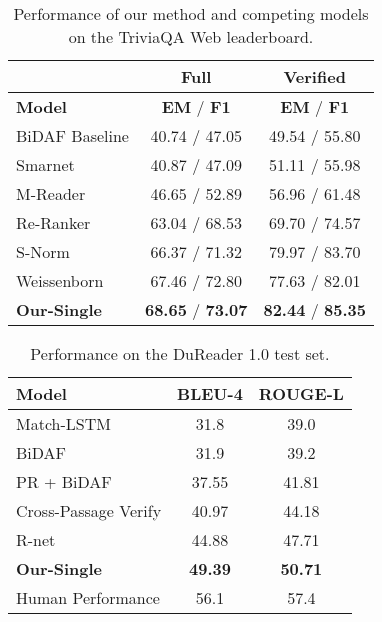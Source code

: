 \documentclass[letterpaper]{article} \usepackage{aaai19}  \usepackage{graphicx}
\begin{document}
\begin{table}[t]
\scriptsize
\centering
\caption{\label{tab:1} Performance of our method and competing models on the TriviaQA Web leaderboard.}
\begin{tabular}{lcc}
\hline
     & \textbf{Full} & \textbf{Verified} \\
\hline
   \textbf{Model} & \textbf{EM} / \textbf{F1} & \textbf{EM} / \textbf{F1} \\
\hline
    BiDAF Baseline \cite{joshi2017triviaqa} & 40.74 / 47.05 &  49.54 / 55.80 \\
    Smarnet \cite{chen2017smarnet} & 40.87 / 47.09 & 51.11 / 55.98 \\
    M-Reader \cite{hu2017reinforced} & 46.65 / 52.89 & 56.96 / 61.48 \\
    Re-Ranker \cite{wang2017evidence} &  63.04 / 68.53 &  69.70 / 74.57 \\
    S-Norm \cite{clark2017simple} &  66.37 / 71.32 &  79.97 / 83.70 \\
Weissenborn \cite{weissenborn2017dynamic}  &  67.46 / 72.80 &  77.63 / 82.01 \\
\hline
    \textbf{Our-Single} & \textbf{68.65} / \textbf{73.07}  & \textbf{82.44} / \textbf{85.35} \\
\hline
\end{tabular} \vspace{-3mm}
\end{table} 

\begin{table}[t]
\scriptsize
\centering
\caption{\label{tab:2} Performance on the DuReader 1.0 test set.}
\begin{tabular}{lcc}
\hline
   \textbf{Model} & \textbf{BLEU-4}  & \textbf{ROUGE-L} \\
\hline
    Match-LSTM \cite{wang2016machine} & 31.8 &  39.0 \\
    BiDAF \cite{seo2016bidirectional} & 31.9 & 39.2 \\
    PR + BiDAF \cite{wang2018multi} &  37.55 &  41.81 \\
    Cross-Passage Verify \cite{wang2018multi} &  40.97 &  44.18 \\
    R-net \cite{wang2017gated} & 44.88 & 47.71 \\
    \textbf{Our-Single} &  \textbf{49.39} &  \textbf{50.71} \\
\hline
    Human Performance & 56.1  & 57.4 \\
\hline
\end{tabular} \vspace{-3mm}
\end{table} 
\end{document}
